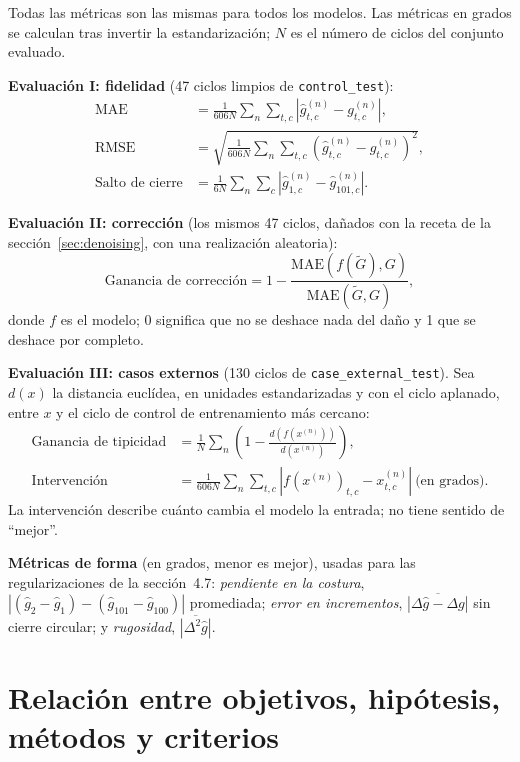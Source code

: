 \documentclass[11pt,a4paper]{article}
\newcommand{\Mae}{\mathrm{MAE}}
\begin{document}
Todas las métricas son las mismas para todos los modelos. Las métricas en grados se calculan tras invertir la estandarización; $N$ es el número de ciclos del conjunto evaluado.

\textbf{Evaluación I: fidelidad} (47 ciclos limpios de \texttt{control\_test}):
\begin{align}
\Mae&=\frac{1}{606N}\sum_{n}\sum_{t,c}\left|\hat g^{(n)}_{t,c}-g^{(n)}_{t,c}\right|,\\
\mathrm{RMSE}&=\sqrt{\frac{1}{606N}\sum_{n}\sum_{t,c}\left(\hat g^{(n)}_{t,c}-g^{(n)}_{t,c}\right)^2},\\
\text{Salto de cierre}&=\frac{1}{6N}\sum_{n}\sum_{c}\left|\hat g^{(n)}_{1,c}-\hat g^{(n)}_{101,c}\right|.
\end{align}

\textbf{Evaluación II: corrección} (los mismos 47 ciclos, dañados con la receta de la sección~\ref{sec:denoising}, con una realización aleatoria):
\begin{equation}
\text{Ganancia de corrección}=1-\frac{\Mae(f(\tilde G),G)}{\Mae(\tilde G,G)} ,
\end{equation}
donde $f$ es el modelo; 0 significa que no se deshace nada del daño y 1 que se deshace por completo.

\textbf{Evaluación III: casos externos} (130 ciclos de \texttt{case\_external\_test}). Sea $d(x)$ la distancia euclídea, en unidades estandarizadas y con el ciclo aplanado, entre $x$ y el ciclo de control de entrenamiento más cercano:
\begin{align}
\text{Ganancia de tipicidad}&=\frac1N\sum_{n}\left(1-\frac{d(f(x^{(n)}))}{d(x^{(n)})}\right),\\
\text{Intervención}&=\frac{1}{606N}\sum_{n}\sum_{t,c}\left|f(x^{(n)})_{t,c}-x^{(n)}_{t,c}\right|\ \text{(en grados)}.
\end{align}
La intervención describe cuánto cambia el modelo la entrada; no tiene sentido de ``mejor''.

\textbf{Métricas de forma} (en grados, menor es mejor), usadas para las regularizaciones de la sección~4.7: \emph{pendiente en la costura}, $|(\hat g_2-\hat g_1)-(\hat g_{101}-\hat g_{100})|$ promediada; \emph{error en incrementos}, $\overline{|\Delta\hat g-\Delta g|}$ sin cierre circular; y \emph{rugosidad}, $\overline{|\Delta^2\hat g|}$.

\section{Relación entre objetivos, hipótesis, métodos y criterios}
\label{sec:matriz}
\end{document}
